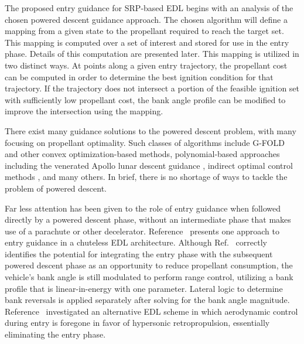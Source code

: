 \documentclass[letterpaper, preprint, paper,11pt]{AAS}
\begin{document}

The proposed entry guidance for SRP-based EDL begins with an analysis of the chosen powered descent guidance approach. The chosen algorithm will define a mapping from a given state to the propellant required to reach the target set. This mapping is computed over a set of interest and stored for use in the entry phase. Details of this computation are presented later. This mapping is utilized in two distinct ways. At points along a given entry trajectory, the propellant cost can be computed in order to determine the best ignition condition for that trajectory. If the trajectory does not intersect a portion of the feasible ignition set with sufficiently low propellant cost, the bank angle profile can be modified to improve the intersection using the mapping.  

There exist many guidance solutions to the powered descent problem, with many focusing on propellant optimality. Such classes of algorithms include G-FOLD\cite{gfold,gfold_flighttests} and other convex optimization-based methods, polynomial-based approaches including the venerated Apollo lunar descent guidance \cite{apollo_lunar}, indirect optimal control methods \cite{PropellantOptimalAdaptiveTrigger}, and many others. In brief, there is no shortage of ways to tackle the problem of powered descent.


Far less attention has been given to the role of entry guidance when followed directly by a powered descent phase, without an intermediate phase that makes use of a parachute or other decelerator. Reference~\cite{LuAdaptiveEDL} presents one approach to entry guidance in a chuteless EDL architecture. Although Ref.~\cite{LuAdaptiveEDL} correctly identifies the potential for integrating the entry phase with the subsequent powered descent phase as an opportunity to reduce propellant consumption, the vehicle's bank angle is still modulated to perform range control, utilizing a bank profile that is linear-in-energy with one parameter. Lateral logic to determine bank reversals is applied separately after solving for the bank angle magnitude. Reference~\cite{EDL_AllProp} investigated an alternative EDL scheme in which aerodynamic control during entry is foregone in favor of hypersonic retropropulsion, essentially eliminating the entry phase. 
\end{document}
